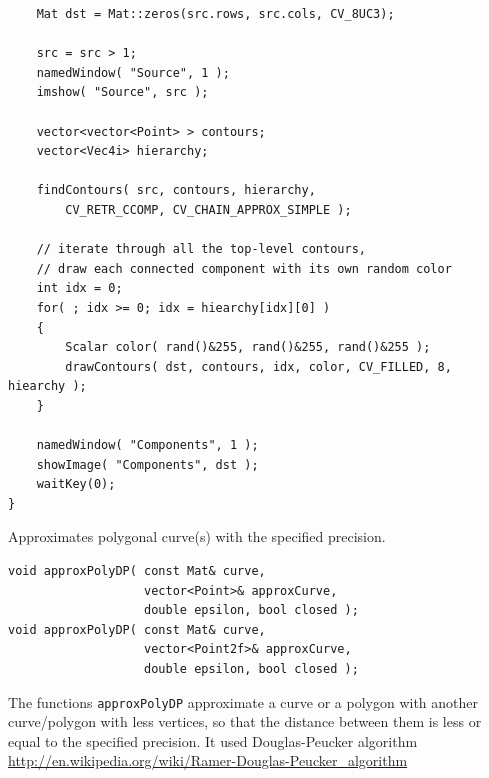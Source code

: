 \begin{description}
\begin{lstlisting}
    Mat dst = Mat::zeros(src.rows, src.cols, CV_8UC3);

    src = src > 1;
    namedWindow( "Source", 1 );
    imshow( "Source", src );

    vector<vector<Point> > contours;
    vector<Vec4i> hierarchy;
    
    findContours( src, contours, hierarchy, 
        CV_RETR_CCOMP, CV_CHAIN_APPROX_SIMPLE );

    // iterate through all the top-level contours,
    // draw each connected component with its own random color
    int idx = 0;
    for( ; idx >= 0; idx = hiearchy[idx][0] )
    {
        Scalar color( rand()&255, rand()&255, rand()&255 );
        drawContours( dst, contours, idx, color, CV_FILLED, 8, hiearchy );
    }

    namedWindow( "Components", 1 );
    showImage( "Components", dst );
    waitKey(0);
}
\end{lstlisting}


\label{approxPolyDP}
Approximates polygonal curve(s) with the specified precision.

\begin{lstlisting}
void approxPolyDP( const Mat& curve,
                   vector<Point>& approxCurve,
                   double epsilon, bool closed );
void approxPolyDP( const Mat& curve,
                   vector<Point2f>& approxCurve,
                   double epsilon, bool closed );
\end{lstlisting}
\begin{description}
\end{description}

The functions \texttt{approxPolyDP} approximate a curve or a polygon with another curve/polygon with less vertices, so that the distance between them is less or equal to the specified precision. It used Douglas-Peucker algorithm \url{http://en.wikipedia.org/wiki/Ramer-Douglas-Peucker_algorithm}


\end{description}
